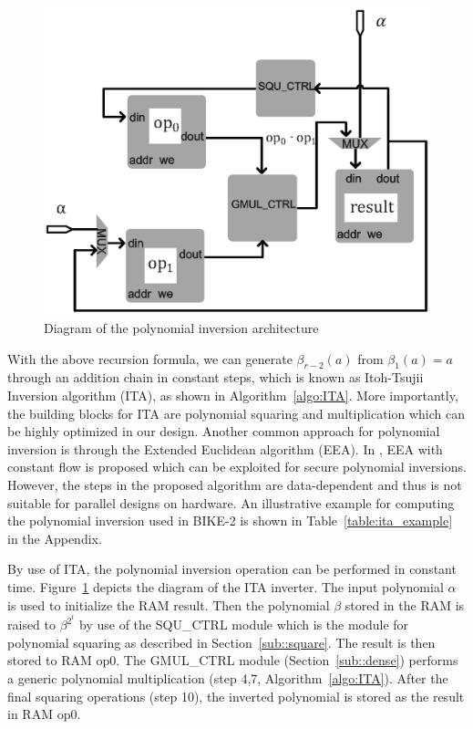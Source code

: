 \documentclass[runningheads]{llncs}
\begin{document}
\begin{figure}[!tb]
\centering
\includegraphics[width=.55\textwidth]{./fig/inv_unit.eps}
\caption{Diagram of the polynomial inversion architecture}\label{fig:inverter}
\end{figure}
With the above recursion formula, we can generate $\beta_{r-2}(a)$ from $\beta_{1}(a)=a$
through an addition chain in constant steps, which is known as
Itoh-Tsujii Inversion algorithm (ITA), as shown in Algorithm~\ref{algo:ITA}.
More importantly, the building blocks for ITA are
polynomial squaring and multiplication which
can be highly optimized in our design.
Another common approach for polynomial inversion
is through the Extended Euclidean algorithm (EEA).
In \cite{georgieva2015toward}, EEA with constant flow is
proposed which can be exploited for secure polynomial inversions.
However, the steps in the proposed algorithm are data-dependent
and thus is not suitable for parallel designs on hardware.
An illustrative example for computing the polynomial inversion used in
BIKE-2 is shown in Table~\ref{table:ita_example} in the Appendix.

By use of ITA, the polynomial inversion operation
can be performed in constant time.
Figure~\ref{fig:inverter} depicts the diagram of the ITA inverter.
The input polynomial $\alpha$ is used to initialize the RAM result.
Then the polynomial $\beta$ stored in the RAM is raised
to ${\beta}^{2^t}$ by use of the SQU\_CTRL module which
is the module for polynomial squaring as described
in Section~\ref{sub::square}.
The result is then stored to RAM op0.
The GMUL\_CTRL module (Section~\ref{sub::dense}) performs a
generic polynomial multiplication
(step 4,7, Algorithm~\ref{algo:ITA}).
After the final squaring operations (step 10),
the inverted polynomial is stored as the result in RAM op0.
\end{document}
